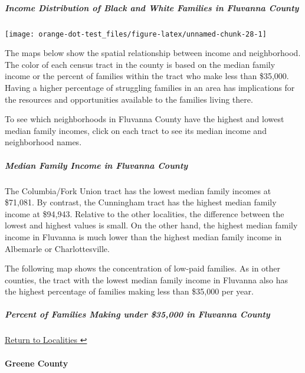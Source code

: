 \documentclass[
]{article}
\begin{document}
\hypertarget{income-distribution-of-black-and-white-families-in-fluvanna-county}{%
\subparagraph{Income Distribution of Black and White Families in
Fluvanna
County}\label{income-distribution-of-black-and-white-families-in-fluvanna-county}}

\begin{center}\texttt{[image: orange-dot-test\_files/figure-latex/unnamed-chunk-28-1]} \end{center}

The maps below show the spatial relationship between income and
neighborhood. The color of each census tract in the county is based on
the median family income or the percent of families within the tract who
make less than \$35,000. Having a higher percentage of struggling
families in an area has implications for the resources and opportunities
available to the families living there.

To see which neighborhoods in Fluvanna County have the highest and
lowest median family incomes, click on each tract to see its median
income and neighborhood names.

\hypertarget{median-family-income-in-fluvanna-county}{%
\subparagraph{Median Family Income in Fluvanna
County}\label{median-family-income-in-fluvanna-county}}

The Columbia/Fork Union tract has the lowest median family incomes at
\$71,081. By contrast, the Cunningham tract has the highest median
family income at \$94,943. Relative to the other localities, the
difference between the lowest and highest values is small. On the other
hand, the highest median family income in Fluvanna is much lower than
the highest median family income in Albemarle or Charlottesville.

The following map shows the concentration of low-paid families. As in
other counties, the tract with the lowest median family income in
Fluvanna also has the highest percentage of families making less than
\$35,000 per year.

\hypertarget{percent-of-families-making-under-35000-in-fluvanna-county}{%
\subparagraph{Percent of Families Making under \$35,000 in Fluvanna
County}\label{percent-of-families-making-under-35000-in-fluvanna-county}}

\protect\hyperlink{localities}{Return to Localities ↩︎}

\hypertarget{greene-county}{%
\paragraph{Greene County}\label{greene-county}}
\end{document}
